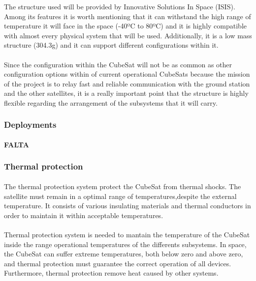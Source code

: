 The structure used will be provided by Innovative Solutions In Space (ISIS). Among its features it is worth mentioning that it can withstand the high range of temperature it will face in the space (-40ºC to 80ºC) and it is highly compatible with almost every physical system that will be used. Additionally, it is a low mass structure (304.3g) and it can support different configurations within it.

\paragraph{}Since the configuration within the CubeSat will not be as common as other configuration options within of current operational CubeSats because the mission of the project is to relay fast and reliable communication with the ground station and the other satellites, it is a really important point that the structure is highly flexible regarding the arrangement of the subsystems that it will carry.

\subsubsection{Deployments}

\paragraph{}\textbf{FALTA}


\subsubsection{Thermal protection}
\paragraph{}The thermal protection system protect the CubeSat from thermal shocks. The satellite must remain in a optimal range of temperatures,despite the external temperature. It consists of various insulating materials and thermal conductors in order to maintain it within acceptable temperatures.

\paragraph{} 
Thermal protection system is needed to mantain the temperature of the CubeSat inside the range operational temperatures of the differents subsystems. In space, the CubeSat can suffer extreme temperatures, both below zero and above zero, and thermal protection must guarantee the correct operation of all devices. Furthermore, thermal protection remove heat caused by other systems.

